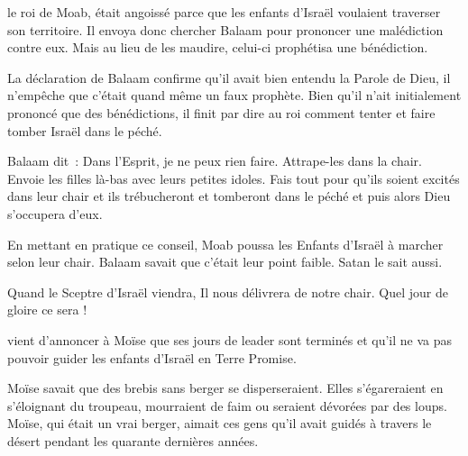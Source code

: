  le roi de Moab, était angoissé parce que
 les enfants d'Israël voulaient traverser son territoire.
 Il envoya donc chercher Balaam pour prononcer une malédiction contre eux.
 Mais au lieu de les maudire, celui-ci prophétisa une bénédiction.

La déclaration de Balaam confirme qu'il avait bien entendu la Parole de Dieu,
 il n'empêche que c'était quand même un faux prophète.
 Bien qu'il n'ait initialement prononcé que des bénédictions,
 il finit par dire au roi comment tenter et faire tomber Israël dans le péché.

Balaam dit~:
 \og Dans l'Esprit, je ne peux rien faire. Attrape-les dans la chair.
 Envoie les filles là-bas avec leurs petites idoles.
 Fais tout pour qu'ils soient excités dans leur chair
 et ils trébucheront et tomberont dans le péché
 \ocadr{}et puis alors Dieu s'occupera d'eux. \fg{}

En mettant en pratique ce conseil, Moab poussa les Enfants d'Israël
 à marcher selon leur chair.
 Balaam savait que c'était leur point faible. Satan le sait aussi.


Quand le Sceptre d'Israël viendra, Il nous délivrera de notre chair.
 Quel jour de gloire ce sera ! 

\dvrule






 vient d'annoncer à Moïse que ses jours de leader
 sont terminés et qu'il ne va pas pouvoir guider les enfants d'Israël
 en Terre Promise.

Moïse savait que des brebis sans berger se disperseraient.
 Elles s'égareraient en s'éloignant du troupeau,
 mourraient de faim ou seraient dévorées par des loups.
 Moïse, qui était un vrai berger,
 aimait ces gens qu'il avait guidés à travers le désert
 pendant les quarante dernières années.

